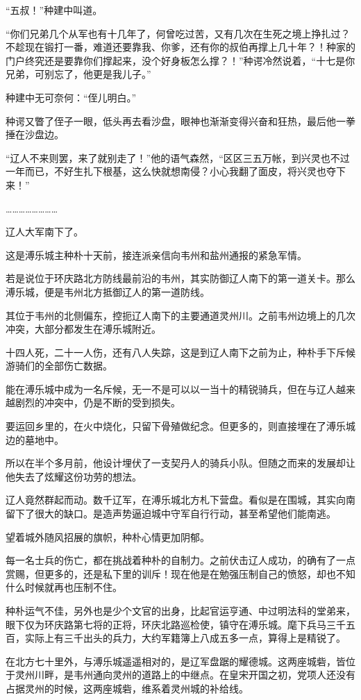 “五叔！”种建中叫道。

“你们兄弟几个从军也有十几年了，何曾吃过苦，又有几次在生死之境上挣扎过？不趁现在锻打一番，难道还要靠我、你爹，还有你的叔伯再撑上几十年？！种家的门户终究还是要靠你们撑起来，没个好身板怎么撑？！”种谔冷然说着，“十七是你兄弟，可别忘了，他更是我儿子。”

种建中无可奈何：“侄儿明白。”

种谔又瞥了侄子一眼，低头再去看沙盘，眼神也渐渐变得兴奋和狂热，最后他一拳捶在沙盘边。

“辽人不来则罢，来了就别走了！”他的语气森然，“区区三五万帐，到兴灵也不过一年而已，不好生扎下根基，这么快就想南侵？小心我翻了面皮，将兴灵也夺下来！”

……………………

辽人大军南下了。

这是溥乐城主种朴十天前，接连派亲信向韦州和盐州通报的紧急军情。

若是说位于环庆路北方防线最前沿的韦州，其实防御辽人南下的第一道关卡。那么溥乐城，便是韦州北方抵御辽人的第一道防线。

其位于韦州的北侧偏东，控扼辽人南下的主要通道灵州川。之前韦州边境上的几次冲突，大部分都发生在溥乐城附近。

十四人死，二十一人伤，还有八人失踪，这是到辽人南下之前为止，种朴手下斥候游骑们的全部伤亡数据。

能在溥乐城中成为一名斥候，无一不是可以以一当十的精锐骑兵，但在与辽人越来越剧烈的冲突中，仍是不断的受到损失。

要运回乡里的，在火中烧化，只留下骨殖做纪念。但更多的，则直接埋在了溥乐城边的墓地中。

所以在半个多月前，他设计埋伏了一支契丹人的骑兵小队。但随之而来的发展却让他失去了炫耀这份功劳的想法。

辽人竟然群起而动。数千辽军，在溥乐城北方札下营盘。看似是在围城，其实向南留下了很大的缺口。是造声势逼迫城中守军自行行动，甚至希望他们能南逃。

望着城外随风招展的旗帜，种朴心情更加阴郁。

每一名士兵的伤亡，都在挑战着种朴的自制力。之前伏击辽人成功，的确有了一点赏赐，但更多的，还是私下里的训斥！现在他是在勉强压制自己的愤怒，却也不知什么时候就再也压制不住。

种朴运气不佳，另外也是少个文官的出身，比起官运亨通、中过明法科的堂弟来，眼下仅为环庆路第七将的正将，环庆北路巡检使，镇守在溥乐城。麾下兵马三千五百，实际上有三千出头的兵力，大约军籍簿上八成五多一点，算得上是精锐了。

在北方七十里外，与溥乐城遥遥相对的，是辽军盘踞的耀德城。这两座城砦，皆位于灵州川畔，是韦州通向灵州的道路上的中继点。在皇宋开国之初，党项人还没有占据灵州的时候，这两座城砦，维系着灵州城的补给线。


